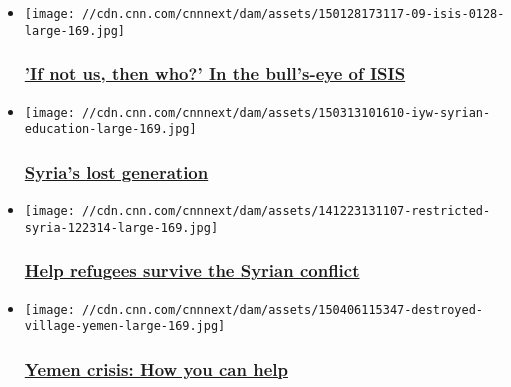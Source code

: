 \begin{itemize}
\item
  \href{/2015/03/14/intl_world/iyw-aid-workers-in-danger/index.html}{}

  \texttt{[image: //cdn.cnn.com/cnnnext/dam/assets/150128173117-09-isis-0128-large-169.jpg]}

  \hypertarget{if-not-us-then-who-in-the-bulls-eye-of-isis}{%
  \subsubsection{\texorpdfstring{\href{/2015/03/14/intl_world/iyw-aid-workers-in-danger/index.html}{'If
  not us, then who?' In the bull's-eye of
  ISIS}}{'If not us, then who?' In the bull's-eye of ISIS}}\label{if-not-us-then-who-in-the-bulls-eye-of-isis}}
\item
  \href{/2015/03/30/world/iyw-syria-education-deferred/index.html}{}

  \texttt{[image: //cdn.cnn.com/cnnnext/dam/assets/150313101610-iyw-syrian-education-large-169.jpg]}

  \hypertarget{syrias-lost-generation-}{%
  \subsubsection{\texorpdfstring{\href{/2015/03/30/world/iyw-syria-education-deferred/index.html}{Syria's
  lost generation
  }}{Syria's lost generation }}\label{syrias-lost-generation-}}
\item
  \href{/2015/01/06/world/iyw-syria-resource-list/index.html}{}

  \texttt{[image: //cdn.cnn.com/cnnnext/dam/assets/141223131107-restricted-syria-122314-large-169.jpg]}

  \hypertarget{help-refugees-survive-the-syrian-conflict}{%
  \subsubsection{\texorpdfstring{\href{/2015/01/06/world/iyw-syria-resource-list/index.html}{Help
  refugees survive the Syrian
  conflict}}{Help refugees survive the Syrian conflict}}\label{help-refugees-survive-the-syrian-conflict}}
\item
  \href{/2015/04/06/world/iyw-yemen-resource-list/index.html}{}

  \texttt{[image: //cdn.cnn.com/cnnnext/dam/assets/150406115347-destroyed-village-yemen-large-169.jpg]}

  \hypertarget{yemen-crisis-how-you-can-help}{%
  \subsubsection{\texorpdfstring{\href{/2015/04/06/world/iyw-yemen-resource-list/index.html}{Yemen
  crisis: How you can
  help}}{Yemen crisis: How you can help}}\label{yemen-crisis-how-you-can-help}}
\end{itemize}


